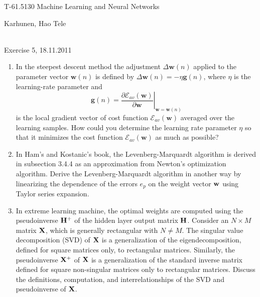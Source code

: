 \documentclass[10pt]{article}
\begin{document}
\pagestyle{empty}
\begin{Large}
\begin{bf} 
T-61.5130 Machine Learning and Neural Networks\\ 
\end{bf}
\end{Large}
Karhunen, Hao Tele\\  
\\
\begin{large}
\begin{bf}
Exercise 5,  18.11.2011
\end{bf}
\end{large}
\begin{enumerate}

\item In the steepest descent method the adjustment
$\Delta\mathbf{w}(n)$ applied to the parameter vector $\mathbf{w}(n)$
is defined by $\Delta\mathbf{w}(n)=-\eta\mathbf{g}(n)$, where $\eta$
is the learning-rate parameter and
\begin{equation*}
\mathbf{g}(n)=\left.\frac{\partial
\mathcal{E}_{av}(\mathbf{w})}{\partial \mathbf{w}}\right|_{\mathbf{w}=\mathbf{w}(n)}
\end{equation*}
is the local gradient vector of cost
function $\mathcal{E}_{av}(\mathbf{w})$ averaged over the learning
samples. How could you determine the learning rate parameter $\eta$ so
that it minimizes the cost function $\mathcal{E}_{av}(\mathbf{w})$ as much as possible?

\vspace{2mm}

\item In Ham's and Kostanic's book, the Levenberg-Marquardt algorithm is derived
  in subsection 3.4.4 as an approximation from Newton's optimization algorithm.
  Derive the Levenberg-Marquardt algorithm in another way by linearizing
  the dependence of the errors $e_p$ on the weight vector ${\bf w}$ using
  Taylor series expansion.

\vspace{2mm}

\item In extreme learning machine, the optimal weights are computed using the
pseudoinverse ${\bf H}^+$ of the hidden layer output matrix ${\bf H}$. Consider
an $N \times M$ matrix ${\bf X}$, which is generally rectangular with $N \neq M$.
The singular value decomposition (SVD) of ${\bf X}$ is a generalization of the
eigendecomposition, defined for square matrices only, to rectangular matrices.
Similarly, the pseudoinverse ${\bf X}^+$ of ${\bf X}$ is a generalization of the
standard inverse matrix defined for square non-singular matrices only to
rectangular matrices. Discuss the definitions, computation, and interrelationships
of the SVD and pseudoinverse of ${\bf X}$.


\end{enumerate}
\end{document}
